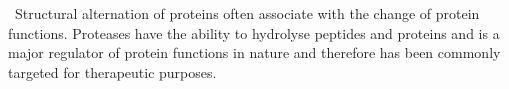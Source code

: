\ Structural alternation of proteins often associate with the change of protein functions. Proteases have the ability to hydrolyse peptides and proteins and is a major regulator of protein functions in nature and therefore has been commonly targeted for therapeutic purposes. 